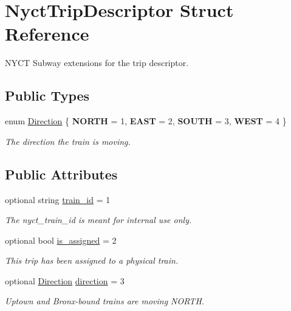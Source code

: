 \hypertarget{structNyctTripDescriptor}{}\section{Nyct\+Trip\+Descriptor Struct Reference}
\label{structNyctTripDescriptor}


N\+Y\+CT Subway extensions for the trip descriptor.  


\subsection*{Public Types}
\begin{DoxyCompactItemize}
\item 
enum \hyperlink{structNyctTripDescriptor_a44bbbcd4762dfa1f89093b52ec7725a4}{Direction} \{ {\bfseries N\+O\+R\+TH} = 1, 
{\bfseries E\+A\+ST} = 2, 
{\bfseries S\+O\+U\+TH} = 3, 
{\bfseries W\+E\+ST} = 4
 \}\hypertarget{structNyctTripDescriptor_a44bbbcd4762dfa1f89093b52ec7725a4}{}\label{structNyctTripDescriptor_a44bbbcd4762dfa1f89093b52ec7725a4}
\begin{DoxyCompactList}\small\item\em The direction the train is moving. \end{DoxyCompactList}
\end{DoxyCompactItemize}
\subsection*{Public Attributes}
\begin{DoxyCompactItemize}
\item 
optional string \hyperlink{structNyctTripDescriptor_a03a9908ba609b45afe28699e06dc01fb}{train\+\_\+id} = 1
\begin{DoxyCompactList}\small\item\em The nyct\+\_\+train\+\_\+id is meant for internal use only. \end{DoxyCompactList}\item 
optional bool \hyperlink{structNyctTripDescriptor_aeb67c25d340de4442fe41d5cfe4b6005}{is\+\_\+assigned} = 2
\begin{DoxyCompactList}\small\item\em This trip has been assigned to a physical train. \end{DoxyCompactList}\item 
optional \hyperlink{structNyctTripDescriptor_a44bbbcd4762dfa1f89093b52ec7725a4}{Direction} \hyperlink{structNyctTripDescriptor_a0803947324a7c58b27475e1f57fbbb46}{direction} = 3
\begin{DoxyCompactList}\small\item\em Uptown and Bronx-\/bound trains are moving N\+O\+R\+TH. \end{DoxyCompactList}\end{DoxyCompactItemize}


